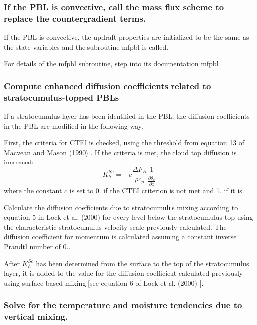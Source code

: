 \subsubsection*{If the P\+BL is convective, call the mass flux scheme to replace the countergradient terms.}

If the P\+BL is convective, the updraft properties are initialized to be the same as the state variables and the subroutine mfpbl is called.

For details of the mfpbl subroutine, step into its documentation \hyperlink{group___h_e_d_m_f_ga5787e718b62c0502c0734303a16cd8ed}{mfpbl}

\subsubsection*{Compute enhanced diffusion coefficients related to stratocumulus-\/topped P\+B\+Ls}

If a stratocumulus layer has been identified in the P\+BL, the diffusion coefficients in the P\+BL are modified in the following way.


\begin{DoxyEnumerate}
\item First, the criteria for C\+T\+EI is checked, using the threshold from equation 13 of Macvean and Mason (1990) \cite{macvean_and_mason_1990}. If the criteria is met, the cloud top diffusion is increased\+: \[ K_h^{Sc} = -c\frac{\Delta F_R}{\rho c_p}\frac{1}{\frac{\partial \theta_v}{\partial z}} \] where the constant $c$ is set to 0. if the C\+T\+EI criterion is not met and 1. if it is.
\item Calculate the diffusion coefficients due to stratocumulus mixing according to equation 5 in Lock et al. (2000) \cite{lock_et_al_2000} for every level below the stratocumulus top using the characteristic stratocumulus velocity scale previously calculated. The diffusion coefficient for momentum is calculated assuming a constant inverse Prandtl number of 0..
\end{DoxyEnumerate}

After $K_h^{Sc}$ has been determined from the surface to the top of the stratocumulus layer, it is added to the value for the diffusion coefficient calculated previously using surface-\/based mixing \mbox{[}see equation 6 of Lock et al. (2000) \cite{lock_et_al_2000} \mbox{]}.

\subsubsection*{Solve for the temperature and moisture tendencies due to vertical mixing.}

